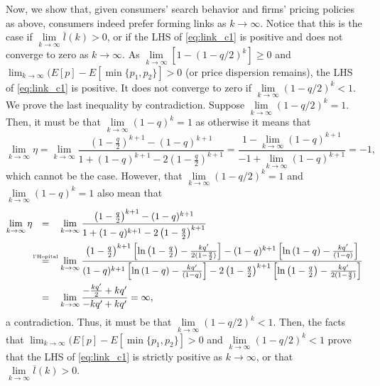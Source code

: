 \documentclass[12pt]{article}
\newcommand\myeq{\mathrel{\stackrel{\makebox[0pt]{\mbox{\normalfont\tiny
					l'Hopital}}}{=}}}
\begin{document}
Now, we show that, given consumers' search behavior and firms' pricing policies 
as above,  consumers indeed prefer forming links as $k \to \infty$.  
Notice that this is the case if $\lim\limits_{k \to \infty}\overline{l}(k)>0$, 
or if the LHS of \eqref{eq:link_c1} is positive and does not converge to zero 
as $k\to \infty$.  As $\lim\limits_{k \to \infty}[1-(1-q/2)^k]\geq 0$ 
and $\lim_{k \to \infty}(E[p]-E[\min\{p_1,p_2\}]>0$ (or price dispersion 
remains), the LHS of \eqref{eq:link_c1} is positive.  It does not converge to 
zero if $\lim\limits_{k \to \infty}(1-q/2)^k <1.$  We prove the last inequality 
by contradiction.  Suppose $\lim\limits_{k \to \infty}(1-q/2)^k =1.$  Then, it 
must be that $\lim\limits_{k \to \infty}(1-q)^k =1$ as otherwise it means that
\begin{equation*}
\lim\limits_{k\to \infty}\eta = \lim\limits_{k \to \infty} 
\frac{\left(1-\frac{q}{2}\right)^{k+1} - (1-q)^{k+1}}{1 + (1-q)^{k+1} - 
	2 \left(1-\frac{q}{2}\right)^{k+1}} =  \frac{1 - \lim\limits_{k \to \infty}
	(1-q)^{k+1}}{-1+ \lim\limits_{k \to \infty} (1-q)^{k+1}} =-1,
\end{equation*}
which cannot be the case.  However, that $\lim\limits_{k \to \infty}(1-q/2)^k 
=1$ and  $\lim\limits_{k \to \infty}(1-q)^k =1$ also mean that
\begin{equation*}
\begin{aligned}
\lim\limits_{k\to \infty}\eta &&=&&& \lim\limits_{k \to \infty} 
\frac{\left(1-\frac{q}{2}\right)^{k+1} - (1-q)^{k+1}}{1 + (1-q)^{k+1} - 
	2 \left(1-\frac{q}{2}\right)^{k+1}}\\
 &&\myeq&&&  \lim\limits_{k \to \infty} 
 \frac{\left(1-\frac{q}{2}\right)^{k+1}\left[\ln\left(1 - \frac{q}{2}\right) - 
 \frac{k q'}{2(1-\frac{q}{2})}\right] - (1-q)^{k+1}\left[\ln\left(1 -  q\right) 
 - \frac{k q'}{(1-q)}\right]}{(1-q)^{k+1}\left[\ln\left(1 -  q\right) - \frac{k 
 q'}{(1-q)}\right] - 	2 \left(1-\frac{q}{2}\right)^{k+1}\left[\ln\left(1 - 
 \frac{q}{2}\right) - \frac{k q'}{2(1-\frac{q}{2})}\right]}\\
&&=&&& \lim\limits_{k \to \infty} \frac{-\frac{k q'}{2} + k q'}{-kq' +kq'} = 
\infty,
\end{aligned}
\end{equation*}
a contradiction.  Thus, it must be that $\lim\limits_{k \to \infty}(1-q/2)^k 
<1$. Then, the facts that $\lim_{k \to \infty}(E[p]-E[\min\{p_1,p_2\}]>0$ and 
$\lim\limits_{k \to \infty}(1-q/2)^k <1$ prove that the LHS of 
\eqref{eq:link_c1} is strictly positive as $k \to \infty$, or that 
$\lim\limits_{k \to \infty}\overline{l}(k)>0$. 
\end{document}
